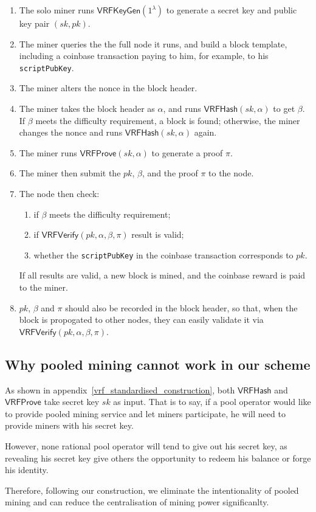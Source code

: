 \begin{enumerate}
    \item The solo miner runs $\mathsf{VRFKeyGen}(1^{\lambda})$ to generate a secret key and public key pair $(sk, pk)$.
    \item The miner queries the the full node it runs, and build a block template, including a coinbase transaction paying to him, for example, to his \texttt{scriptPubKey}.
    \item The miner alters the nonce in the block header.
    \item The miner takes the block header as $\alpha$, and runs $\mathsf{VRFHash}(sk, \alpha)$ to get $\beta$. If $\beta$ meets the difficulty requirement, a block is found; otherwise, the miner changes the nonce and runs $\mathsf{VRFHash}(sk, \alpha)$ again.
    \item The miner runs $\mathsf{VRFProve}(sk, \alpha)$ to generate a proof $\pi$.
    \item The miner then submit the $pk$, $\beta$, and the proof $\pi$ to the node.
    \item The node then check:
        \begin{enumerate}
            \item if $\beta$ meets the difficulty requirement;
            \item if $\mathsf{VRFVerify}(pk, \alpha, \beta, \pi)$ result is valid;
            \item whether the \texttt{scriptPubKey} in the coinbase transaction corresponds to $pk$.
        \end{enumerate}
        If all results are valid, a new block is mined, and the coinbase reward is paid to the miner.
    \item $pk$, $\beta$ and $\pi$ should also be recorded in the block header, so that, when the block is propogated to other nodes, they can easily validate it via $\mathsf{VRFVerify}(pk, \alpha, \beta, \pi)$.
\end{enumerate}

\subsection{Why pooled mining cannot work in our scheme}

As shown in appendix~\ref{vrf_standardised_construction}, both $\mathsf{VRFHash}$ and $\mathsf{VRFProve}$ take secret key $sk$ as input.
That is to say, if a pool operator would like to provide pooled mining service and let miners participate, he will need to provide miners with his secret key.

However, none rational pool operator will tend to give out his secret key, as revealing his secret key give others the opportunity to redeem his balance or forge his identity.

Therefore, following our construction, we eliminate the intentionality of pooled mining and can reduce the centralisation of mining power significanlty.
